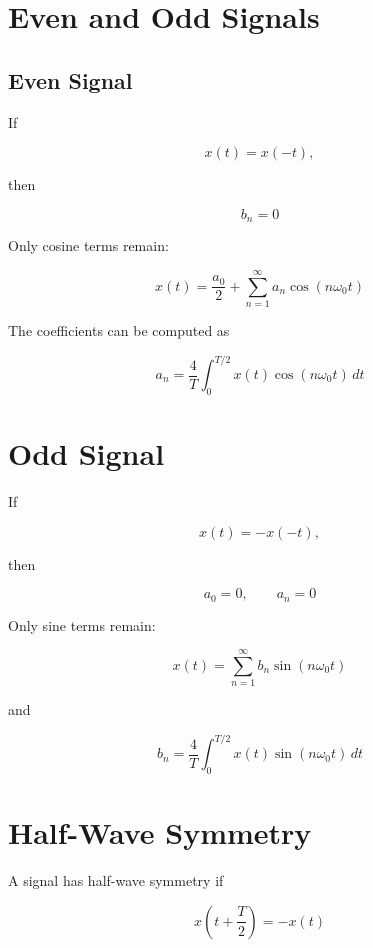 
\section{Even and Odd Signals}


\subsection{Even Signal}

If

\[
x(t)=x(-t),
\]

then

\[
\boxed{
b_n=0
}
\]

Only cosine terms remain:

\[
x(t)=
\frac{a_0}{2}
+
\sum_{n=1}^{\infty}
a_n\cos(n\omega_0 t)
\]

The coefficients can be computed as

\[
\boxed{
a_n=
\frac{4}{T}
\int_0^{T/2}
x(t)\cos(n\omega_0 t)\,dt
}
\]


\section{Odd Signal}

If

\[
x(t)=-x(-t),
\]

then

\[
\boxed{
a_0=0,\qquad a_n=0
}
\]

Only sine terms remain:

\[
x(t)=
\sum_{n=1}^{\infty}
b_n\sin(n\omega_0 t)
\]

and

\[
\boxed{
b_n=
\frac{4}{T}
\int_0^{T/2}
x(t)\sin(n\omega_0 t)\,dt
}
\]


\section{Half-Wave Symmetry}

A signal has half-wave symmetry if

\[
\boxed{
x\left(t+\frac{T}{2}\right)=-x(t)
}
\]

